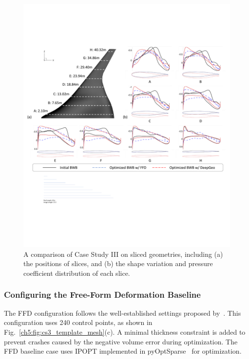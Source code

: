 \begin{figure}[!th]
    \vspace{2mm}
    \begin{center}
        \includegraphics[width=1\linewidth]{chapter5/fig/bwb_optim_slice.pdf}
    \end{center}
    \caption{
        \small A comparison of Case Study III on sliced geometries, including (a) the positions of slices, and (b) the shape variation and pressure coefficient distribution of each slice.
    }
    \label{ch5:fig:cs3_slice}
\end{figure}



\subsubsection{Configuring the Free-Form Deformation Baseline}

The FFD configuration follows the well-established settings proposed by~\citet{aa.Lyu2014}. This configuration uses 240 control points, as shown in Fig.~\ref{ch5:fig:cs3_template_mesh}(c). A minimal thickness constraint is added to prevent crashes caused by the negative volume error during optimization. The FFD baseline case uses IPOPT implemented in pyOptSparse~\cite{aa.Wu2020} for optimization.

